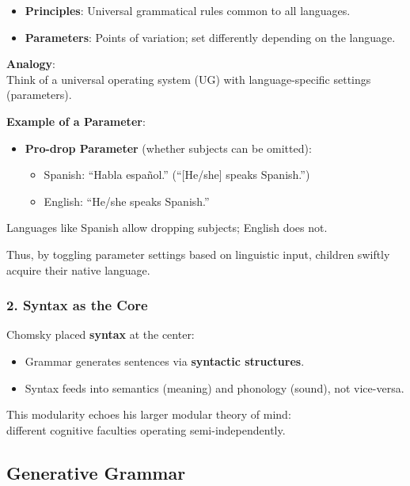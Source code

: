 \documentclass[12pt]{article}
\newcommand{\tightlist}{\itemsep 0pt\parskip 0pt\parsep 0pt}
\begin{document}
\begin{itemize}
\tightlist
\item
  \textbf{Principles}: Universal grammatical rules common to all
  languages.
\item
  \textbf{Parameters}: Points of variation; set differently depending on
  the language.
\end{itemize}

\textbf{Analogy}:\\
Think of a universal operating system (UG) with language-specific
settings (parameters).

\textbf{Example of a Parameter}:

\begin{itemize}
\tightlist
\item
  \textbf{Pro-drop Parameter} (whether subjects can be omitted):

  \begin{itemize}
  \tightlist
  \item
    Spanish: ``Habla español.'' (``{[}He/she{]} speaks Spanish.'')
  \item
    English: ``He/she speaks Spanish.''
  \end{itemize}
\end{itemize}

Languages like Spanish allow dropping subjects; English does not.

Thus, by toggling parameter settings based on linguistic input, children
swiftly acquire their native language.

\hypertarget{syntax-as-the-core}{%
\subsubsection{2. Syntax as the Core}\label{syntax-as-the-core}}

Chomsky placed \textbf{syntax} at the center:

\begin{itemize}
\tightlist
\item
  Grammar generates sentences via \textbf{syntactic structures}.
\item
  Syntax feeds into semantics (meaning) and phonology (sound), not
  vice-versa.
\end{itemize}

This modularity echoes his larger modular theory of mind:\\
different cognitive faculties operating semi-independently.

\hypertarget{generative-grammar}{%
\subsection{Generative Grammar}\label{generative-grammar}}
\end{document}
